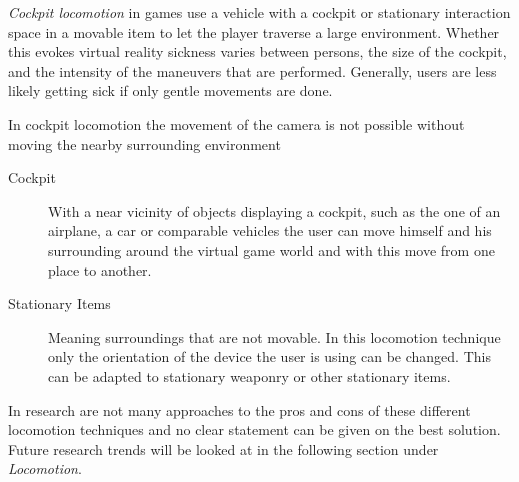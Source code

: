 \textit{Cockpit locomotion} in games use a vehicle with a cockpit or stationary interaction space in a movable item to let the player traverse a large environment. Whether this evokes virtual reality sickness varies between persons, the size of the cockpit, and the intensity of the maneuvers that are performed. Generally, users are less likely getting sick if only gentle movements are done.

In cockpit locomotion the movement of the camera is not possible without moving 
the nearby surrounding environment
\begin{description}
	\item[Cockpit]With a near vicinity of objects displaying a cockpit, such as 
	the one of an airplane, a car or comparable vehicles the user can move 
	himself and his surrounding around the virtual game world and with this 
	move from one place to another.
	\item[Stationary Items]Meaning surroundings that are not movable. In this 
	locomotion technique only the orientation of the device the user is using 
	can be changed. This can be adapted to stationary weaponry or other 
	stationary items.
\end{description}

In research are not many approaches to the pros and cons of these different locomotion 
techniques and no clear statement can be given on the best solution. 
Future research trends will be looked at in the following section under 
\textit{Locomotion}.

